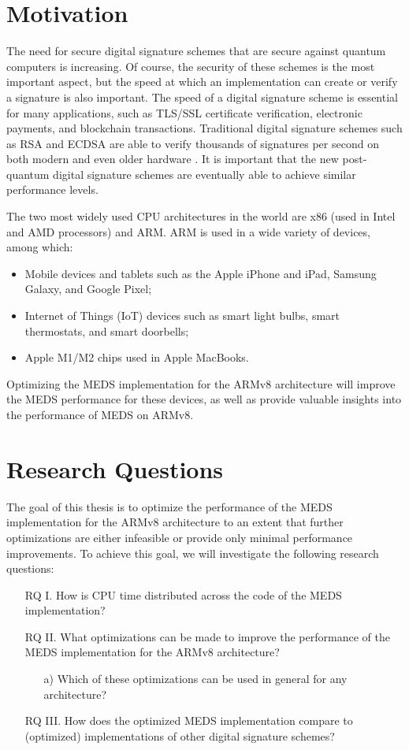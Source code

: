 \documentclass[11pt,a4paper]{report}
\theoremstyle{definition}
\begin{document}
\section{Motivation}
The need for secure digital signature schemes that are secure against quantum computers is increasing. Of course, the security of these schemes is the most important aspect, but the speed at which an implementation can create or verify a signature is also important. The speed of a digital signature scheme is essential for many applications, such as TLS/SSL certificate verification, electronic payments, and blockchain transactions. Traditional digital signature schemes such as RSA \cite{rivest1978method} and ECDSA \cite{johnson2001elliptic} are able to verify thousands of signatures per second on both modern and even older hardware \cite{koppl2021performance,de1998performance}. It is important that the new post-quantum digital signature schemes are eventually able to achieve similar performance levels.

The two most widely used CPU architectures in the world are x86 (used in Intel and AMD processors) and ARM. ARM is used in a wide variety of devices, among which:
\begin{itemize}
  \item Mobile devices and tablets such as the Apple iPhone and iPad, Samsung Galaxy, and Google Pixel;
  \item Internet of Things (IoT) devices such as smart light bulbs, smart thermostats, and smart doorbells;
  \item Apple M1/M2 chips used in Apple MacBooks.
\end{itemize}
Optimizing the MEDS implementation for the ARMv8 architecture will improve the MEDS performance for these devices, as well as provide valuable insights into the performance of MEDS on ARMv8.

\section{Research Questions}
The goal of this thesis is to optimize the performance of the MEDS implementation for the ARMv8 architecture to an extent that further optimizations are either infeasible or provide only minimal performance improvements. To achieve this goal, we will investigate the following research questions:
\begin{itemize}[left=35pt,labelsep=15pt]
  \item[RQ I.] How is CPU time distributed across the code of the MEDS implementation?
  \item[RQ II.] What optimizations can be made to improve the performance of the MEDS implementation for the ARMv8 architecture?
  \begin{itemize}
    \item[a)] Which of these optimizations can be used in general for any 
    architecture?
  \end{itemize}
  \item[RQ III.] How does the optimized MEDS implementation compare to (optimized) implementations of other digital signature schemes?
\end{itemize}
\end{document}
